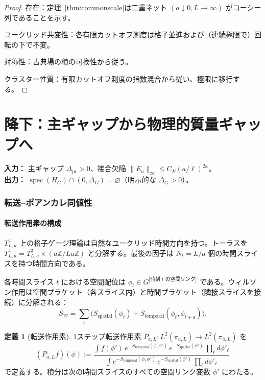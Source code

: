 \documentclass[12pt]{article}
\theoremstyle{plain}
\theoremstyle{definition}
\newtheorem{definition}[theorem]{定義}
\numberwithin{equation}{section}
\newcommand{\Z}{\mathbb{Z}}
\newcommand{\spec}{\operatorname{spec}}
\newcommand{\pr}{\mathrm{pr}}
\begin{document}
\begin{proof}
存在：定理~\ref{thm:commonscale}は二重ネット $(a\downarrow 0,L\to\infty)$ がコーシー列であることを示す。

ユークリッド共変性：各有限カットオフ測度は格子並進および（連続極限で）回転の下で不変。

対称性：古典場の積の可換性から従う。

クラスター性質：有限カットオフ測度の指数混合から従い、極限に移行する。
\end{proof}


\part{降下：主ギャップから物理的質量ギャップへ}

\noindent\textbf{入力：} 主ギャップ $\Delta_{\pr}>0$、接合欠陥 $\|E_a\|_\infty\leq C_E(a/\ell)^{2\omega}$。\\
\textbf{出力：} $\spec(H_G)\cap(0,\Delta_G)=\varnothing$（明示的な $\Delta_G>0$）。

\section{転送--ポアンカレ同値性}\label{sec:transferPoincare}

\subsection{転送作用素の構成}

$T^4_{L,a}$ 上の格子ゲージ理論は自然なユークリッド時間方向を持つ。トーラスを $T^4_{L,a}=T^3_{L,a}\times(a\Z/La\Z)$ と分解する。最後の因子は $N_t=L/a$ 個の時間スライスを持つ時間方向である。

各時間スライス $t$ における空間配位は $\phi_t\in G^{|\text{時刻 }t\text{ の空間リンク}|}$ である。ウィルソン作用は空間プラケット（各スライス内）と時間プラケット（隣接スライスを接続）に分解される：
\begin{equation}
S_W = \sum_t\bigl(S_{\mathrm{spatial}}(\phi_t)+S_{\mathrm{temporal}}(\phi_t,\phi_{t+a})\bigr).
\end{equation}

\begin{definition}[転送作用素]
1ステップ転送作用素 $P_{a,L}:L^2(\pi_{a,L})\to L^2(\pi_{a,L})$ を
\begin{equation}
(P_{a,L}f)(\phi) := \frac{\int f(\phi')\,e^{-S_{\mathrm{temporal}}(\phi,\phi')}\,e^{-S_{\mathrm{spatial}}(\phi')}\,\prod_\ell d\phi'_\ell}{\int e^{-S_{\mathrm{temporal}}(\phi,\phi')}\,e^{-S_{\mathrm{spatial}}(\phi')}\,\prod_\ell d\phi'_\ell}
\end{equation}
で定義する。積分は次の時間スライスのすべての空間リンク変数 $\phi'$ にわたる。
\end{definition}
\end{document}
